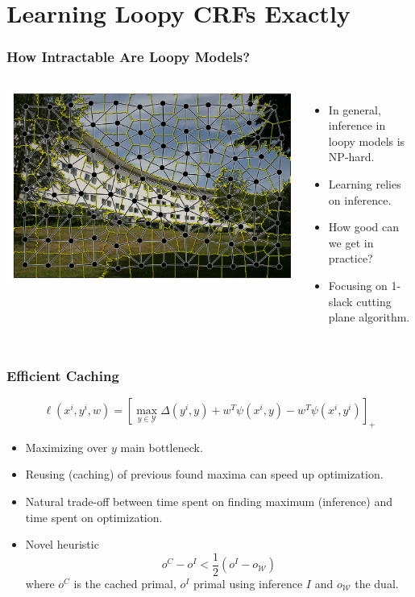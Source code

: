 \documentclass[final,ignorenonframetext,compress]{beamer}
\newcommand{\hoch}[1]{^{#1}}
\newcommand{\W}{\mathcal{W}}
\begin{document}
\section{Learning Loopy CRFs Exactly}
\begin{frame}
    \frametitle{How Intractable Are Loopy Models?}
    \begin{columns}[c]
        \includegraphics[width=\linewidth]{images/scene_sp_graph}%
        \begin{itemize}
            \item In general, inference in loopy models is NP-hard.
            \item Learning relies on inference.
            \item How good can we get in practice?
            \item Focusing on 1-slack cutting plane algorithm.
        \end{itemize}
    \end{columns}
\end{frame}

\begin{frame}
    \frametitle{Efficient Caching}
        \begin{equation}
            \ell(x\hoch{i}, y\hoch{i}, w) = [\max_{y \in \mathcal{Y}} \Delta(y\hoch{i}, y) + w^T \psi(x\hoch{i}, y) - w^T \psi(x\hoch{i}, y\hoch{i})]_+
        \end{equation}
        \begin{itemize}
            \item<1-> Maximizing over $y$ main bottleneck.
            \item<2-> Reusing (caching) of previous found maxima can speed up optimization.
            \item<3-> Natural trade-off between time spent on finding maximum (inference) and time spent on optimization.
            \item<4-> Novel heuristic
                \begin{equation*}
                            o^C - o^I < \frac{1}{2} (o^I - o_{\W})
                \end{equation*}
                        where $o^C$ is the cached primal, $o^I$ primal using inference $I$ and $o_{\W}$ the dual.
        \end{itemize}
\end{frame}
\end{document}
